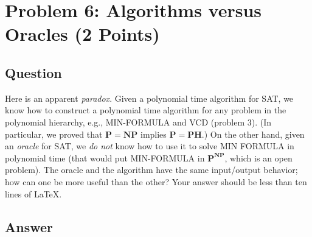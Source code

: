 \documentclass{article}
\begin{document}




\newpage
\section*{Problem 6: Algorithms versus Oracles (2 Points)}

\subsection*{Question}
Here is an apparent {\em paradox}. Given a polynomial time algorithm for SAT, we know how to construct a polynomial time algorithm for any problem in the polynomial hierarchy, e.g., MIN-FORMULA and VCD (problem 3). (In particular, we proved that $\mathbf{P} = \mathbf{NP}$ implies $\mathbf{P} = \mathbf{PH}$.) On the other hand, given an \emph{oracle} for SAT, we \emph{do not} know how to use it to solve MIN FORMULA in polynomial time (that would put MIN-FORMULA in $\mathbf{P}^{\mathbf{NP}}$, which is an open problem). The oracle and the algorithm have the same input/output behavior; how can one be more useful than the other? Your answer should be less than ten lines of LaTeX.

\subsection*{Answer}
\end{document}
